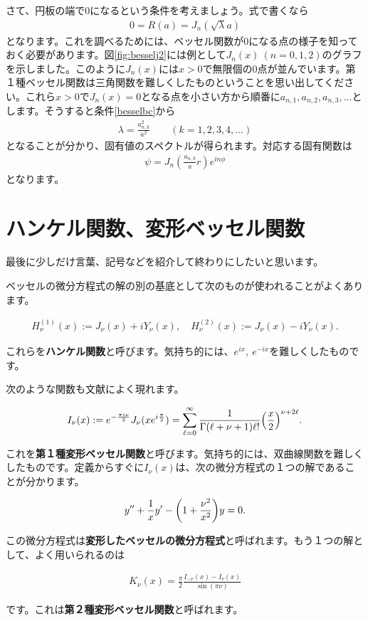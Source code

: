 \documentclass[report,paper=a4, fontsize=12pt, line_length=16cm, number_of_lines=33,dvipdfmx]{jlreq}
\newenvironment{important}{\begin{tcolorbox}[
  colback = white,
  colframe = red!35,
  boxrule = 2mm,
  fonttitle = \bfseries,
  after = \noindent] }{\end{tcolorbox}}
\numberwithin{equation}{section}
\newcommand{\strong}[1]{\textsf{\bfseries #1}}
\begin{document}
さて、円板の端で$0$になるという条件を考えましょう。式で書くなら
\begin{align}
  0=R(a)=J_n(\sqrt{\lambda}a)\label{besselbc}
\end{align}
となります。これを調べるためには、ベッセル関数が0になる点の様子を知っておく必要があります。図\ref{fig:besselj2}には例として$J_n(x)\ (n=0,1,2)$のグラフを示しました。このように$J_n(x)$には$x>0$で無限個の0点が並んでいます。第１種ベッセル関数は三角関数を難しくしたものということを思い出してください。これら$x>0$で$J_n(x)=0$となる点を小さい方から順番に$a_{n,1},a_{n,2},a_{n,3},\dots$とします。そうすると条件\eqref{besselbc}から
\begin{align}
  \lambda=\frac{a_{n,k}^2}{a^2}\qquad (k=1,2,3,4,\dots)
\end{align}
となることが分かり、固有値のスペクトルが得られます。対応する固有関数は
\begin{align}
  \psi=J_n(\frac{a_{n,k}}{a}r)e^{in\phi}
\end{align}
となります。



\section{ハンケル関数、変形ベッセル関数}
最後に少しだけ言葉、記号などを紹介して終わりにしたいと思います。

ベッセルの微分方程式の解の別の基底として次のものが使われることがよくあります。
\begin{important}
  \begin{align}
    H^{(1)}_{\nu}(x):=J_{\nu}(x)+iY_{\nu}(x),\quad
    H^{(2)}_{\nu}(x):=J_{\nu}(x)-iY_{\nu}(x).
  \end{align}    
\end{important}
これらを\strong{ハンケル関数}と呼びます。気持ち的には、$e^{ix},\ e^{-ix}$を難しくしたものです。

次のような関数も文献によく現れます。
\begin{important}
  \begin{align}
    I_{\nu}(x):=e^{-\frac{\pi i \nu}{2}}J_{\nu}(xe^{i\frac{\pi}{2}})
    =\sum_{\ell=0}^{\infty}\frac{1}{\Gamma(\ell+\nu+1)\ell!}\qty(\frac{x}{2})^{\nu+2\ell}.
  \end{align}    
\end{important}
これを\strong{第１種変形ベッセル関数}と呼びます。気持ち的には、双曲線関数を難しくしたものです。定義からすぐに$I_{\nu}(x)$は、次の微分方程式の１つの解であることが分かります。
\begin{important}
  \begin{align}
    y''+\frac{1}{x}y'-\qty(1+\frac{\nu^2}{x^2})y=0.
  \end{align}
\end{important}
この微分方程式は\strong{変形したベッセルの微分方程式}と呼ばれます。もう１つの解として、よく用いられるのは
\begin{important}
  \begin{align}
    K_{\nu}(x)=\frac{\pi}{2}\frac{I_{-\nu}(x)-I_{\nu}(x)}{\sin(\pi\nu)}
  \end{align}
\end{important}
です。これは\strong{第２種変形ベッセル関数}と呼ばれます。
\end{document}
